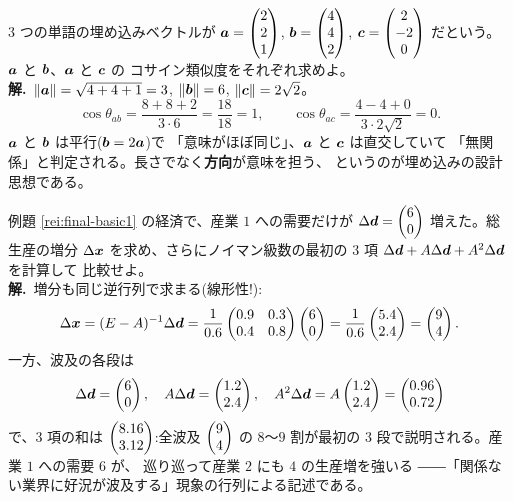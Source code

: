 \begin{rei}[例題・基本(コサイン類似度)]\label{rei:final-basic3}
$3$ つの単語の埋め込みベクトルが
$\bm{a} = \begin{pmatrix}2 \\ 2 \\ 1\end{pmatrix}$, $\bm{b} = \begin{pmatrix}4 \\ 4 \\ 2\end{pmatrix}$,
$\bm{c} = \begin{pmatrix}2 \\ -2 \\ 0\end{pmatrix}$ だという。
$\bm{a}$ と $\bm{b}$、$\bm{a}$ と $\bm{c}$ の
コサイン類似度をそれぞれ求めよ。\\
\textbf{解.}\ $\|\bm{a}\| = \sqrt{4 + 4 + 1} = 3$,
$\|\bm{b}\| = 6$, $\|\bm{c}\| = 2\sqrt{2}$。
\[
\cos\theta_{ab} = \frac{8 + 8 + 2}{3 \cdot 6} = \frac{18}{18} = 1,
\qquad
\cos\theta_{ac} = \frac{4 - 4 + 0}{3 \cdot 2\sqrt{2}} = 0.
\]
$\bm{a}$ と $\bm{b}$ は平行($\bm{b} = 2\bm{a}$)で
「意味がほぼ同じ」、$\bm{a}$ と $\bm{c}$ は直交していて
「無関係」と判定される。長さでなく\textbf{方向}が意味を担う、
というのが埋め込みの設計思想である。
\end{rei}

\begin{rei}[例題・標準(波及効果の分解)]\label{rei:final-std1}
例題 \ref{rei:final-basic1} の経済で、産業 $1$ への需要だけが
$\Delta\bm{d} = \begin{pmatrix}6 \\ 0\end{pmatrix}$ 増えた。総生産の増分
$\Delta\bm{x}$ を求め、さらにノイマン級数の最初の $3$ 項
$\Delta\bm{d} + A\Delta\bm{d} + A^2\Delta\bm{d}$ を計算して
比較せよ。\\
\textbf{解.}\ 増分も同じ逆行列で求まる(線形性!):
\[
\Delta\bm{x} = (E - A)^{-1}\Delta\bm{d}
= \frac{1}{0.6}\begin{pmatrix}0.9 & 0.3 \\ 0.4 & 0.8\end{pmatrix}\begin{pmatrix}6 \\ 0\end{pmatrix}
= \frac{1}{0.6}\begin{pmatrix}5.4 \\ 2.4\end{pmatrix} = \begin{pmatrix}9 \\ 4\end{pmatrix}.
\]
一方、波及の各段は
\[
\Delta\bm{d} = \begin{pmatrix}6 \\ 0\end{pmatrix}, \quad
A\Delta\bm{d} = \begin{pmatrix}1.2 \\ 2.4\end{pmatrix}, \quad
A^2\Delta\bm{d} = A\begin{pmatrix}1.2 \\ 2.4\end{pmatrix} = \begin{pmatrix}0.96 \\ 0.72\end{pmatrix}
\]
で、$3$ 項の和は $\begin{pmatrix}8.16 \\ 3.12\end{pmatrix}$:全波及 $\begin{pmatrix}9 \\ 4\end{pmatrix}$ の
$8$〜$9$ 割が最初の $3$ 段で説明される。産業 $1$ への需要 $6$ が、
巡り巡って産業 $2$ にも $4$ の生産増を強いる
――「関係ない業界に好況が波及する」現象の行列による記述である。
\end{rei}

